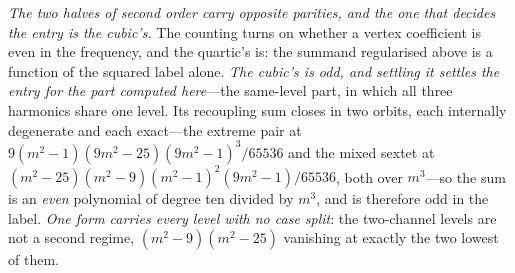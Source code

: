 \documentclass[11pt,a4paper]{article}
\theoremstyle{plain}
\theoremstyle{definition}
\theoremstyle{remark}
\begin{document}
\emph{The two halves of second order carry opposite parities, and the one that decides the entry is the cubic's.}
The counting turns on whether a vertex coefficient is even in the frequency, and the quartic's is: the summand
regularised above is a function of the squared label alone. \emph{The cubic's is odd, and settling it settles the
entry for the part computed here}---the same-level part, in which all three harmonics share one level. Its
recoupling sum closes in two orbits, each internally degenerate and each exact---the extreme pair at
$9(m^{2}-1)(9m^{2}-25)(9m^{2}-1)^{3}/65536$ and the mixed sextet at
$(m^{2}-25)(m^{2}-9)(m^{2}-1)^{2}(9m^{2}-1)/65536$, both over $m^{3}$---so the sum is an \emph{even} polynomial of
degree ten divided by $m^{3}$, and is therefore odd in the label. \emph{One form carries every level with no case
split}: the two-channel levels are not a second regime, $(m^{2}-9)(m^{2}-25)$ vanishing at exactly the two lowest
of them.
\end{document}
